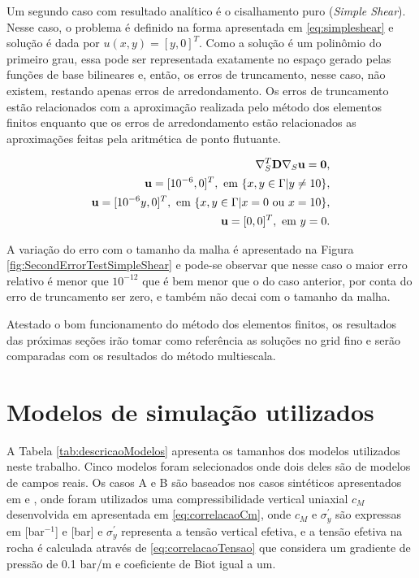     
Um segundo caso com resultado analítico é o cisalhamento puro (\textit{Simple Shear}). Nesse caso, o problema é definido na forma apresentada em \eqref{eq:simpleshear}  e solução é dada por $u(x,y) = [y, 0]^T$. Como a solução é um polinômio do primeiro grau, essa pode ser representada exatamente no espaço gerado pelas funções de base bilineares e, então, os erros de truncamento, nesse caso, não existem, restando apenas  erros de arredondamento. Os erros de truncamento estão relacionados com a aproximação realizada pelo método dos elementos finitos enquanto que os erros de arredondamento estão relacionados as aproximações feitas pela aritmética de ponto flutuante.


\begin{equation}\label{eq:simpleshear}
    \begin{aligned}
       \nabla_S^T \mathbf{D} \nabla_S  \mathbf{u} = \mathbf{0} , \\
        \mathbf{u} = [10^{-6}, 0]^T, \text{ em } \{x, y \in \Gamma | y \neq 10\} ,\\
        \mathbf{u} = [10^{-6}y, 0]^T, \text{ em } \{x, y \in \Gamma | x = 0 \text{ ou } x = 10\}, \\
        \mathbf{u} = [0, 0]^T, \text{ em } y=0.
    \end{aligned}
\end{equation}

A variação do erro com o tamanho da malha é apresentado na Figura \ref{fig:SecondErrorTestSimpleShear} e pode-se observar que nesse caso o maior erro relativo é menor que $10^{-12}$ que é bem menor que o do caso anterior, por conta do erro de truncamento ser zero, e também não decai com o tamanho da malha.

Atestado o bom funcionamento do método dos elementos finitos, os resultados das próximas seções irão tomar como referência as soluções no grid fino e serão comparadas com os resultados do método multiescala.


\section{Modelos de simulação utilizados}

 A Tabela \ref{tab:descricaoModelos} apresenta os tamanhos dos modelos utilizados neste trabalho. Cinco modelos foram selecionados onde dois deles são de modelos de campos reais. Os casos A e B são baseados nos casos sintéticos apresentados em \cite{casteletto} e \cite{irina}, onde foram utilizados uma compressibilidade vertical uniaxial $c_M$ desenvolvida em \citet{correlacaoE} apresentada em \eqref{eq:correlacaoCm}, onde $c_M$ e $\sigma_y^\prime$ são expressas em [bar$^{-1}$] e [bar] e  $\sigma_y^\prime$ representa a tensão vertical efetiva, e a tensão efetiva na rocha é calculada através de  \eqref{eq:correlacaoTensao} que considera um gradiente de pressão de 0.1 bar/m e coeficiente de Biot igual a um.

